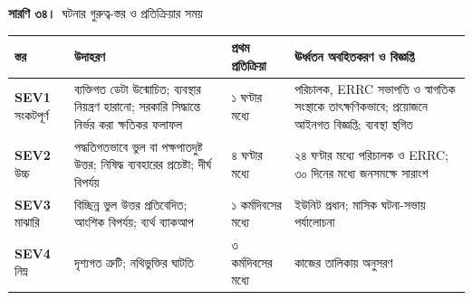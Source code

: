 \documentclass[border=10pt]{standalone}
\begin{document}
\begin{minipage}{17cm}
{\large\bfseries সারণি ৩৪।}\ {\large ঘটনার গুরুত্ব-স্তর ও প্রতিক্রিয়ার সময়}\par\vspace{7pt}
\small
{}
\begin{tabularx}{\linewidth}{@{}>{\hsize=0.565\hsize\raggedright\arraybackslash}X>{\hsize=1.600\hsize\raggedright\arraybackslash}X>{\hsize=0.659\hsize\raggedright\arraybackslash}X>{\hsize=1.176\hsize\raggedright\arraybackslash}X@{}}
\arrayrulecolor{bapilrule}\toprule
\rowcolor{white}\textbf{স্তর} & \textbf{উদাহরণ} & \textbf{প্রথম প্রতিক্রিয়া} & \textbf{ঊর্ধ্বতন অবহিতকরণ ও বিজ্ঞপ্তি} \\
\midrule
\textbf{SEV1} সংকটপূর্ণ & ব্যক্তিগত ডেটা উন্মোচিত; ব্যবস্থার নিয়ন্ত্রণ হারানো; সরকারি সিদ্ধান্তে নির্ভর করা ক্ষতিকর ফলাফল & ১ ঘণ্টার মধ্যে & পরিচালক, ERRC সভাপতি ও স্বাগতিক সংস্থাকে তাৎক্ষণিকভাবে; প্রয়োজনে আইনগত বিজ্ঞপ্তি; ব্যবস্থা স্থগিত \\
\textbf{SEV2} উচ্চ & পদ্ধতিগতভাবে ভুল বা পক্ষপাতদুষ্ট উত্তর; নিষিদ্ধ ব্যবহারের প্রচেষ্টা; দীর্ঘ বিপর্যয় & ৪ ঘণ্টার মধ্যে & ২৪ ঘণ্টার মধ্যে পরিচালক ও ERRC; ৩০ দিনের মধ্যে জনসমক্ষে সারাংশ \\
\textbf{SEV3} মাঝারি & বিচ্ছিন্ন ভুল উত্তর প্রতিবেদিত; আংশিক বিপর্যয়; ব্যর্থ ব্যাকআপ & ১ কর্মদিবসের মধ্যে & ইউনিট প্রধান; মাসিক ঘটনা-সভায় পর্যালোচনা \\
\textbf{SEV4} নিম্ন & দৃশ্যগত ত্রুটি; নথিভুক্তির ঘাটতি & ৩ কর্মদিবসের মধ্যে & কাজের তালিকায় অনুসরণ \\
\bottomrule
\end{tabularx}
\par{}
\end{minipage}
\end{document}
